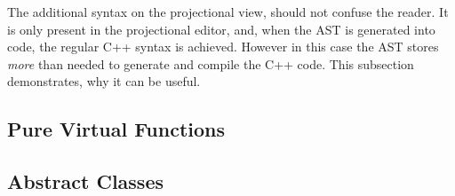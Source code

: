
The additional syntax on the projectional view, should not confuse the reader. It is only 
present in the projectional editor, and, when the AST is generated into code, the regular
C++ syntax is achieved. However in this case the AST stores \emph{more} than needed to 
generate and compile the C++ code. This subsection demonstrates, why it can be useful.



\subsection{Pure Virtual Functions}

\subsection{Abstract Classes}


